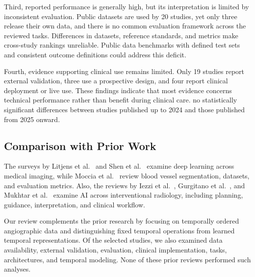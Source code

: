 Third, reported performance is generally high, but its interpretation is limited by inconsistent evaluation. Public datasets are used by 20 studies, yet only three release their own data, and there is no common evaluation framework across the reviewed tasks. Differences in datasets, reference standards, and metrics make cross-study rankings unreliable. Public data benchmarks with defined test sets and consistent outcome definitions could address this deficit.

Fourth, evidence supporting clinical use remains limited. Only 19 studies report external validation, three use a prospective design, and four report clinical deployment or live use. These findings indicate that most evidence concerns technical performance rather than benefit during clinical care.  no statistically significant differences between studies published up to 2024 and those published from 2025 onward. 


\subsection{Comparison with Prior Work}

The surveys by Litjens et al.~\cite{Litjens2017} and Shen et al.~\cite{Shen2017} examine deep learning across medical imaging, while Moccia et al.~\cite{Moccia2018} review blood vessel segmentation, datasets, and evaluation metrics. Also, the reviews by Iezzi et al.~\cite{Iezzi2019}, Gurgitano et al.~\cite{Gurgitano2021}, and Mukhtar et al.~\cite{Mukhtar2025} examine AI across interventional radiology, including planning, guidance, interpretation, and clinical workflow.



Our review complements the prior research by focusing on temporally ordered angiographic data and distinguishing fixed temporal operations from learned temporal representations. Of the selected studies, we also examined data availability, external validation, evaluation, clinical implementation, tasks, architectures, and temporal modeling. None of these prior reviews performed such analyses.



